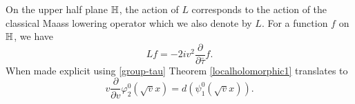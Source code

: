 On the upper half plane $\mathbb{H}$, the action of $L$ corresponds to the action of the classical Maass lowering operator which we also denote by $L$. For a function $f$ on $\mathbb{H}$, we have
\[
Lf  = -2iv^2 \frac{\partial}{\partial \bar{\tau}} f.
\]
When made explicit using \eqref{group-tau} Theorem \ref{localholomorphic1} translates to
\begin{equation}\label{partial-d}
v \frac{\partial}{\partial v }  \varphi_2^0(\sqrt{v}x) =  d
\left(\psi_1^0(\sqrt{v}x)\right).
\end{equation}

